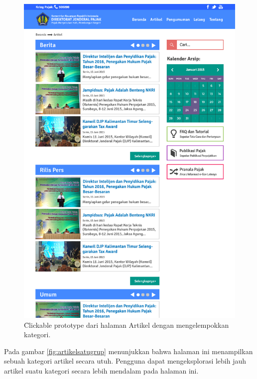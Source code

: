 \begin{enumerate}
		\begin{figure}
			\centering
			\includegraphics[width=\textwidth]
			{pics/Artikelgrup.jpg}
			\caption{\f{Clickable prototype} dari halaman Artikel dengan mengelempokkan kategori.}
			\label{fig:artikelgrup}
		\end{figure}
	\pagebreak Pada gambar \ref{fig:artikelsatugrup} menunjukkan bahwa halaman ini menampilkan sebuah kategori artikel secara utuh. Pengguna dapat mengeksplorasi lebih jauh artikel suatu kategori secara lebih mendalam pada halaman ini.
		\begin{figure}
			\centering

\end{figure}
\end{enumerate}
